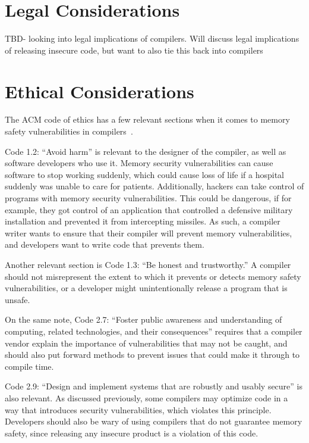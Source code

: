 \documentclass[sigconf, anonymous]{acmart}
\begin{document}
\section{Legal Considerations}
\label{legal considerations}

TBD- looking into legal implications of compilers. Will discuss legal implications of releasing insecure code, but want to also tie this back into compilers


\section{Ethical Considerations}
\label{ethical considerations}

The ACM code of ethics has a few relevant sections when it comes to memory safety vulnerabilities in compilers~\cite{ACMCODE}. 

Code 1.2: “Avoid harm” is relevant to the designer of the compiler, as well as software developers who use it. Memory security vulnerabilities can cause software to stop working suddenly, which could cause loss of life if a hospital suddenly was unable to care for patients. Additionally, hackers can take control of programs with memory security vulnerabilities. This could be dangerous, if for example, they got control of an application that controlled a defensive military installation and prevented it from intercepting missiles. As such, a compiler writer wants to ensure that their compiler will prevent memory vulnerabilities, and developers want to write code that prevents them. 

Another relevant section is Code 1.3: “Be honest and trustworthy.” A compiler should not misrepresent the extent to which it prevents or detects memory safety vulnerabilities, or a developer might unintentionally release a program that is unsafe. 

On the same note, Code 2.7: “Foster public awareness and understanding of computing, related technologies, and their consequences” requires that a compiler vendor explain the importance of vulnerabilities that may not be caught, and should also put forward methods to prevent issues that could make it through to compile time. 

Code 2.9: “Design and implement systems that are robustly and usably secure” is also relevant. As discussed previously, some compilers may optimize code in a way that introduces security vulnerabilities, which violates this principle. Developers should also be wary of using compilers that do not guarantee memory safety, since releasing any insecure product is a violation of this code. 
\end{document}
